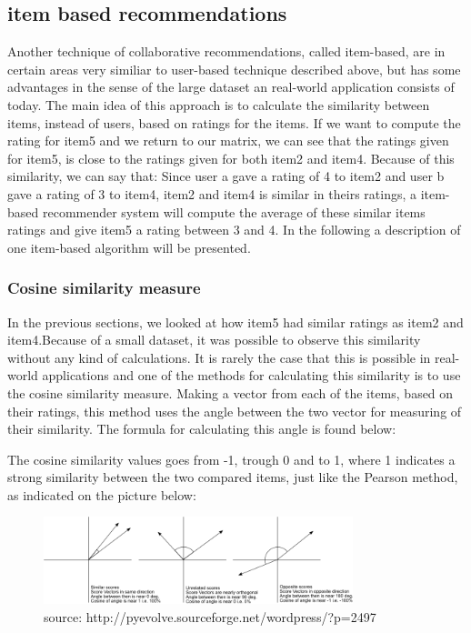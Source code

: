 
\subsection{item based recommendations} %
\label{sub:item_based_recommendations}
Another technique of collaborative recommendations, called item-based, are in certain areas very similiar to user-based technique described above, but has some advantages in the sense of the large dataset an real-world application consists of today. The main idea of this approach is to calculate the similarity between items, instead of users, based on ratings for the items. If we want to compute the rating for item5 and we return to our matrix, we can see that the ratings given for item5, is close to the ratings given for both item2 and item4. Because of this similarity, we can say that: Since user a gave a rating of 4 to item2 and user b gave a rating of 3 to item4, item2 and item4 is similar in theirs ratings, a item-based recommender system will compute the average of these similar items ratings and give item5 a rating between 3 and 4. 
In the following a description of one item-based algorithm will be presented. 

\subsubsection{Cosine similarity measure}
In the previous sections, we looked at how item5 had similar ratings as item2 and item4.Because of a small dataset, it was possible to observe this similarity without any kind of calculations. It is rarely the case that this is possible in real-world applications and one of the methods for calculating this similarity is to use the cosine similarity measure. Making a vector from each of the items, based on their ratings, this method uses the angle between the two vector for measuring of their similarity. The formula for calculating this angle is found below:


The cosine similarity values goes from -1, trough 0 and to 1, where 1 indicates a strong similarity between the two compared items, just like the Pearson method, as indicated on the picture below:

\begin{figure}[ht!]
\centering
\includegraphics[width=90mm]{Pictures/cosinesimilarity.png}
\caption{source: http://pyevolve.sourceforge.net/wordpress/?p=2497}
\label{cosinesimilarity}
\end{figure}

